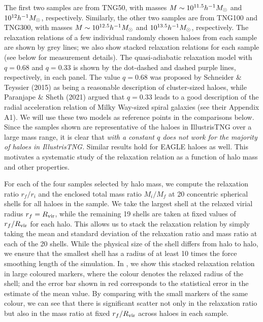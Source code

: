 The first two samples are from TNG50, with masses $M \sim 10^{11.5} h^{-1}M_{\odot}$ and $10^{12} h^{-1}M_{\odot}$, respectively. Similarly, the other two samples are from TNG100 and TNG300, with masses $M \sim 10^{12.5} h^{-1}M_{\odot}$ and $10^{13.5} h^{-1}M_{\odot}$, respectively. The relaxation relations of a few individual randomly chosen haloes from each sample are shown by grey lines; we also show stacked relaxation relations for each sample (see below for measurement details). The quasi-adiabatic relaxation model  with $q=0.68$ and $q=0.33$ is shown by the dot-dashed and dashed purple lines, respectively, in each panel. The value $q=0.68$ was proposed by Schneider $\&$ Teyssier (2015) \citep{2015JCAP...12..049S} as being a reasonable description of cluster-sized haloes, while Paranjape $\&$ Sheth (2021) \citep{2021MNRAS.507..632P} argued that $q=0.33$ leads to a good description of the radial acceleration relation of Milky Way-sized spiral galaxies (see their Appendix A1). We will use these two models as reference points in the comparisons below. Since the samples shown are representative of the haloes in IllustrisTNG over a large mass range, it is clear that \emph{ with a constant $q$ does not work for the majority of haloes in IllustrisTNG.} Similar results hold for EAGLE haloes as well. This motivates a systematic study of the relaxation relation as a function of halo mass and other properties.

For each of the four samples selected by halo mass, we compute the relaxation ratio $r_f/r_i$ and the enclosed total mass ratio $M_i/M_f$ at 20 concentric spherical shells for all haloes in the sample. We take the largest shell at the relaxed virial radius $r_f=R_{\rm{vir}}$, while the remaining 19 shells are taken at fixed values of $r_f/R_{\rm{vir}}$ for each halo. This allows us to stack the relaxation relation by simply taking the mean and standard deviation of the relaxation ratio and mass ratio at each of the 20 shells. While the physical size of the shell differs from halo to halo, we ensure that the smallest shell has a radius of at least 10 times the force smoothing length of the simulation. In , we show this stacked relaxation relation in large coloured markers, where the colour denotes the relaxed radius of the shell; and the error bar shown in red corresponds to the statistical error in the estimate of the mean value. By comparing with the small markers of the same colour, we can see that there is significant scatter not only in the relaxation ratio but also in the mass ratio at fixed $r_f/R_{\rm{vir}}$ across haloes in each sample.

